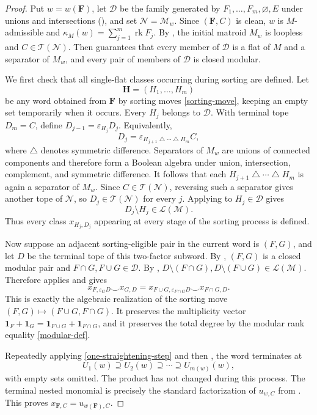 \documentclass[10pt]{amsart}
\theoremstyle{plain}
\theoremstyle{definition}
\newcommand{\one}{\mathbf{1}}
\newcommand{\D}{\mathcal{D}}
\newcommand{\T}{\mathcal{T}}
\newcommand{\M}{\mathcal{M}}
\newcommand{\N}{\mathcal{N}}
\newcommand{\Lcov}{\mathcal{L}}
\newcommand{\rk}{\operatorname{rk}}
\newcommand{\eps}{\varepsilon}
\newcommand{\bF}{\boldsymbol{F}}
\newcommand{\bH}{\boldsymbol{H}}
\begin{document}
\begin{proof}
Put $w=w(\bF)$, let $\D$ be the family generated by $F_1,\ldots,F_m,\varnothing,E$ under unions and intersections (), and set $\N=\M_w$. Since $(\bF,C)$ is clean, $w$ is $M$-admissible and $\kappa_M(w)=\sum_{j=1}^m\rk F_j$. By , the initial matroid $M_w$ is loopless and $C\in\T(\N)$. Then  guarantees that every member of $\D$ is a flat of $M$ and a separator of $M_w$, and every pair of members of $\D$ is closed modular.

We first check that all single-flat classes occurring during sorting are defined. Let
\[
\bH=(H_1,\ldots,H_m)
\]
be any word obtained from $\bF$ by sorting moves \eqref{sorting-move}, keeping an empty set temporarily when it occurs. Every $H_j$ belongs to $\D$. With terminal tope $D_m=C$, define $D_{j-1}=\eps_{H_j}D_j$. Equivalently,
\[
D_j=\eps_{H_{j+1}\mathbin\triangle\cdots\mathbin\triangle H_m}C,
\]
where $\triangle$ denotes symmetric difference. Separators of $M_w$ are unions of connected components and therefore form a Boolean algebra under union, intersection, complement, and symmetric difference. It follows that each $H_{j+1}\mathbin\triangle\cdots\mathbin\triangle H_m$ is again a separator of $M_w$. Since $C\in\T(\N)$, reversing such a separator gives another tope of $\N$, so $D_j\in\T(\N)$ for every $j$. Applying  to $H_j\in\D$ gives
\[
D_j\setminus H_j\in\Lcov(\M).
\]
Thus every class $x_{H_j,D_j}$ appearing at every stage of the sorting process is defined.

Now suppose an adjacent sorting-eligible pair in the current word is $(F,G)$, and let $D$ be the terminal tope of this two-factor subword. By , $(F,G)$ is a closed modular pair and $F\cap G,F\cup G\in\D$. By , $D\setminus (F\cap G),D\setminus(F\cup G)\in\Lcov(\M)$. Therefore  applies and gives
\begin{equation}\label{one-straightening-step}
x_{F,\eps_GD}\smile x_{G,D}=x_{F\cup G,\eps_{F\cap G}D}\smile x_{F\cap G,D}.
\end{equation}
This is exactly the algebraic realization of the sorting move $(F,G)\mapsto(F\cup G,F\cap G)$. It preserves the multiplicity vector $\one_F+\one_G=\one_{F\cup G}+\one_{F\cap G}$, and it preserves the total degree by the modular rank equality \eqref{modular-def}.

Repeatedly applying \eqref{one-straightening-step} and then , the word terminates at
\[
U_1(w)\supseteq U_2(w)\supseteq\cdots\supseteq U_{m(w)}(w),
\]
with empty sets omitted. The product has not changed during this process. The terminal nested monomial is precisely the standard factorization of $u_{w,C}$ from . This proves $x_{\bF,C}=u_{w(\bF),C}$.
\end{proof}
\end{document}
